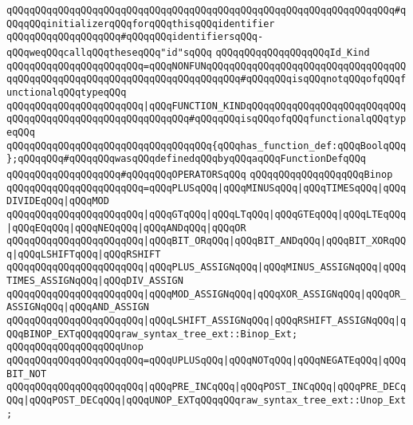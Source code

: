 \verb|qQQqqQQqqQQqqQQqqQQqqQQqqQQqqQQqqQQqqQQqqQQqqQQqqQQqqQQqqQQqqQQqqQQq#qQQqqQQqinitializerqQQqforqQQqthisqQQqidentifier|\newline
\newline
\verb|qQQqqQQqqQQqqQQqqQQq#qQQqqQQqidentifiersqQQq-qQQqweqQQqcallqQQqtheseqQQq"id"sqQQq|\newline
\verb|qQQqqQQqqQQqqQQqqQQqId_Kind|\newline
\verb|qQQqqQQqqQQqqQQqqQQqqQQq=qQQqNONFUNqQQqqQQqqQQqqQQqqQQqqQQqqQQqqQQqqQQqqQQqqQQqqQQqqQQqqQQqqQQqqQQqqQQqqQQqqQQq#qQQqqQQqisqQQqnotqQQqofqQQqfunctionalqQQqtypeqQQq|\newline
\verb|qQQqqQQqqQQqqQQqqQQqqQQq|\verb#|qQQqFUNCTION_KINDqQQqqQQqqQQqqQQqqQQqqQQqqQQqqQQqqQQqqQQqqQQqqQQqqQQqqQQqqQQq#\verb|#qQQqqQQqisqQQqofqQQqfunctionalqQQqtypeqQQq|\newline
\verb|qQQqqQQqqQQqqQQqqQQqqQQqqQQqqQQqqQQq{qQQqhas_function_def:qQQqBoolqQQq};qQQqqQQq#qQQqqQQqwasqQQqdefinedqQQqbyqQQqaqQQqFunctionDefqQQq|\newline
\newline
\verb|qQQqqQQqqQQqqQQqqQQq#qQQqqQQqOPERATORSqQQq|\newline
\verb|qQQqqQQqqQQqqQQqqQQqBinop|\newline
\verb|qQQqqQQqqQQqqQQqqQQqqQQq=qQQqPLUSqQQq|\verb#|qQQqMINUSqQQq|qQQqTIMESqQQq|qQQqDIVIDEqQQq|qQQqMOD#\newline
\verb|qQQqqQQqqQQqqQQqqQQqqQQq|\verb#|qQQqGTqQQq|qQQqLTqQQq|qQQqGTEqQQq|qQQqLTEqQQq|qQQqEQqQQq|qQQqNEQqQQq|qQQqANDqQQq|qQQqOR#\newline
\verb|qQQqqQQqqQQqqQQqqQQqqQQq|\verb#|qQQqBIT_ORqQQq|qQQqBIT_ANDqQQq|qQQqBIT_XORqQQq|qQQqLSHIFTqQQq|qQQqRSHIFT#\newline
\verb|qQQqqQQqqQQqqQQqqQQqqQQq|\verb#|qQQqPLUS_ASSIGNqQQq|qQQqMINUS_ASSIGNqQQq|qQQqTIMES_ASSIGNqQQq|qQQqDIV_ASSIGN#\newline
\verb|qQQqqQQqqQQqqQQqqQQqqQQq|\verb#|qQQqMOD_ASSIGNqQQq|qQQqXOR_ASSIGNqQQq|qQQqOR_ASSIGNqQQq|qQQqAND_ASSIGN#\newline
\verb|qQQqqQQqqQQqqQQqqQQqqQQq|\verb#|qQQqLSHIFT_ASSIGNqQQq|qQQqRSHIFT_ASSIGNqQQq|qQQqBINOP_EXTqQQqqQQqraw_syntax_tree_ext::Binop_Ext;#\newline
\newline
\verb|qQQqqQQqqQQqqQQqqQQqUnop|\newline
\verb|qQQqqQQqqQQqqQQqqQQqqQQq=qQQqUPLUSqQQq|\verb#|qQQqNOTqQQq|qQQqNEGATEqQQq|qQQqBIT_NOT#\newline
\verb|qQQqqQQqqQQqqQQqqQQqqQQq|\verb#|qQQqPRE_INCqQQq|qQQqPOST_INCqQQq|qQQqPRE_DECqQQq|qQQqPOST_DECqQQq|qQQqUNOP_EXTqQQqqQQqraw_syntax_tree_ext::Unop_Ext;#\newline
